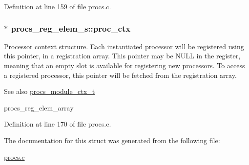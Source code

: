 Definition at line 159 of file procs.\+c.

\subsubsection[{\texorpdfstring{proc\+\_\+ctx}{proc_ctx}}]{$\ast$ procs\+\_\+reg\+\_\+elem\+\_\+s\+::proc\+\_\+ctx}\hypertarget{structprocs__reg__elem__s_aa394ff40393e8ca08c8f4c9b0c965698}{}\label{structprocs__reg__elem__s_aa394ff40393e8ca08c8f4c9b0c965698}
Processor context structure. Each instantiated processor will be registered using this pointer, in a registration array. This pointer may be N\+U\+LL in the register, meaning that an empty slot is available for registering new processors. To access a registered processor, this pointer will be fetched from the registration array. \begin{DoxySeeAlso}{See also}
\hyperlink{procs_8c_ad411ade07d8515e93bc2e7abf2b1e765}{procs\+\_\+module\+\_\+ctx\+\_\+t} 

procs\+\_\+reg\+\_\+elem\+\_\+array 
\end{DoxySeeAlso}


Definition at line 170 of file procs.\+c.



The documentation for this struct was generated from the following file\+:\begin{DoxyCompactItemize}
\item 
\hyperlink{procs_8c}{procs.\+c}\end{DoxyCompactItemize}
